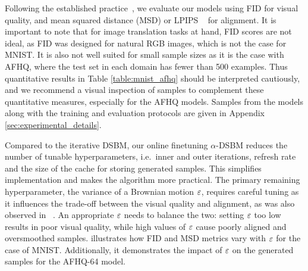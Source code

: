 \documentclass{article}
\begin{document}
Following the established practice~\citep{choi2020starganv2}, we evaluate our models using FID \citep{heusel2017gans} for visual quality, and mean squared distance (MSD) or LPIPS ~\citep{zhang2018unreasonable} for alignment. It is important to note that for image translation tasks at hand, FID scores are not ideal, as FID was designed for natural RGB images, which is not the case for MNIST.  It is also not well suited for small sample sizes as it is the case with AFHQ, where the test set in each domain has fewer than 500 examples. Thus quantitative results in Table \ref{table:mnist_afhq} should be interpreted cautiously, and we recommend a visual inspection of samples to complement these quantitative measures, especially for the AFHQ models. Samples from the models along with the training and evaluation protocols are given in Appendix \ref{sec:experimental_details}.

Compared to the iterative DSBM, our online finetuning $\alpha$-DSBM reduces the number of tunable hyperparameters, i.e.~inner and outer iterations, refresh rate and the size of the cache for storing generated samples. This simplifies implementation and makes the algorithm more practical. The primary remaining hyperparameter, the variance of a Brownian motion $\varepsilon$,  requires careful tuning as it influences the trade-off between the visual quality and alignment, as was also observed in ~\cite{shi2023DSBM}. An appropriate $\varepsilon$ needs to balance the two: setting $\varepsilon$ too low results in poor visual quality, while high values of $\varepsilon$ cause poorly aligned and oversmoothed samples. 
 illustrates how FID and MSD metrics vary with $\varepsilon$ for the case of MNIST. Additionally, it demonstrates the impact of $\varepsilon$ on the generated samples for the AFHQ-64 model.
\end{document}
